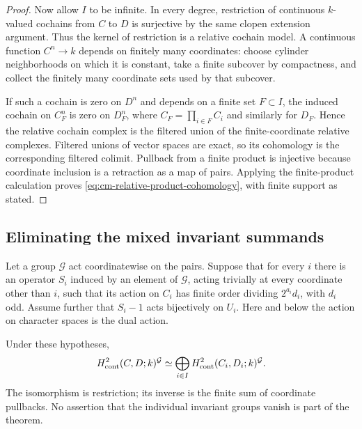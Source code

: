 \begin{proof}
Now allow \(I\) to be infinite. In every degree, restriction of
continuous \(k\)-valued cochains from \(C\) to \(D\) is
surjective by the same clopen extension argument. Thus the kernel
of restriction is a relative cochain model. A continuous function
\(C^n\to k\) depends on finitely many coordinates: choose
cylinder neighborhoods on which it is constant, take a finite
subcover by compactness, and collect the finitely many coordinate
sets used by that subcover.

If such a cochain is zero on \(D^n\) and depends on a finite set
\(F\subset I\), the induced cochain on \(C_F^n\) is zero on
\(D_F^n\), where \(C_F=\prod_{i\in F}C_i\) and similarly
for \(D_F\). Hence the relative cochain complex is the filtered
union of the finite-coordinate relative complexes. Filtered unions
of vector spaces are exact, so its cohomology is the corresponding
filtered colimit. Pullback from a finite product is injective because
coordinate inclusion is a retraction as a map of pairs. Applying the
finite-product calculation proves \eqref{eq:cm-relative-product-cohomology}, with finite support as
stated.
\end{proof}

\subsection{Eliminating the mixed invariant summands}

Let a group \(\mathcal G\) act coordinatewise on the pairs.
Suppose that for every \(i\) there is an operator \(S_i\) induced
by an element of \(\mathcal G\), acting trivially at every
coordinate other than \(i\), such that its action on \(C_i\)
has finite order dividing \(2^{a_i}d_i\), with \(d_i\) odd.
Assume further that \(S_i-1\) acts bijectively on \(U_i\).
Here and below the action on character spaces is the dual action.

\begin{theorem}
\label{thm:cm-cross-prime-central}
Under these hypotheses,
\begin{equation}
 H^2_{\rm cont}(C,D;k)^{\mathcal G}
 \simeq
 \bigoplus_{i\in I}
       H^2_{\rm cont}(C_i,D_i;k)^{\mathcal G}.         \label{eq:cm-prime-central-invariants}
\end{equation}
The isomorphism is restriction; its inverse is the finite sum of
coordinate pullbacks. No assertion that the individual invariant
groups vanish is part of the theorem.
\end{theorem}

